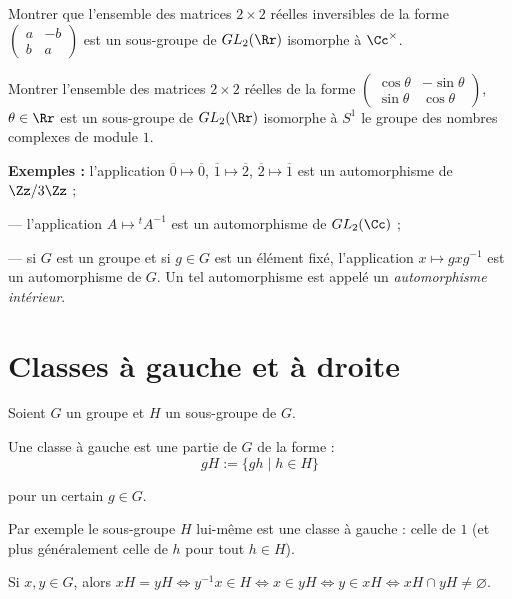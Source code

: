 \documentclass[class=report,crop=false]{standalone}
\newcommand{\GL}{GL}
\begin{document}
\begin{exercicecours}
Montrer que l'ensemble des matrices $2 \times 2$ réelles inversibles de la forme $\left(\begin{array}{cc}
a & -b\\
b&a
\end{array}\right)$ est un sous-groupe de $\GL_2(\Rr)$ isomorphe à $\Cc^\times$.

Montrer l'ensemble des matrices $2 \times 2$ réelles de la forme $\left(\begin{array}{cc}
\cos \theta & -\sin \theta\\
\sin \theta&\cos \theta
\end{array}\right)$, $\theta \in \Rr$ est un sous-groupe de $\GL_2(\Rr)$ isomorphe à $S^1$ le groupe des nombres complexes de module $1$.
\end{exercicecours}

{\bf Exemples : } l'application $\overline{0} \mapsto \overline{0}$, $\overline{1}\mapsto \overline{2}$, $\overline{2} \mapsto \overline{1}$ est un automorphisme de $\Zz/3\Zz$ ;

--- l'application $A \mapsto {}^tA^{-1}$ est un automorphisme de $\GL_2(\Cc)$ ;

--- si $G$ est un groupe et si $g \in G$ est un élément fixé, l'application $x \mapsto gxg^{-1}$ est un automorphisme de $G$. Un tel automorphisme est appelé un {\it automorphisme intérieur}.

\section{Classes à gauche et à droite}

Soient $G$ un groupe et $H$ un sous-groupe de $G$.

\begin{definition}
Une classe à gauche est une partie de $G$ de la forme :
\[gH:=\{gh \mid h \in H\}\]

pour un certain $g \in G$.
\end{definition}

Par exemple le sous-groupe $H$ lui-même est une classe à gauche : celle de $1$ (et plus généralement celle de $h$ pour tout $h \in H$).

\begin{proposition}
Si $x,y \in G$, alors $xH = y H \iff y^{-1} x \in H \iff x \in y H \iff y \in xH \iff xH \cap yH \neq \varnothing$. 
\end{proposition}
\end{document}
